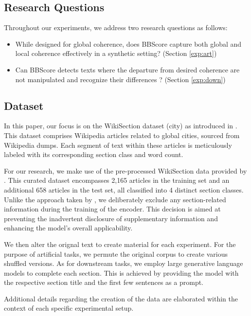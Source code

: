 \documentclass[letterpaper]{article}
\begin{document}
\subsection{Research Questions}
Throughout our experiments, we address two research questions as follows:
\begin{itemize}
\item While designed for global coherence, does BBScore capture both global and local coherence effectively in a synthetic setting? (Section \ref{exp:art})
\item Can BBScore detects texts where the departure from desired coherence are not manipulated and recognize their differences ? (Section \ref{exp:down})
\end{itemize}



\subsection{Dataset}

In this paper, our focus is on the WikiSection dataset (city) as introduced in \citep{arnold-etal-2019-sector}. This dataset comprises Wikipedia articles related to global cities, sourced from Wikipedia dumps. Each segment of text within these articles is meticulously labeled with its corresponding section class and word count.

For our research, we make use of the pre-processed WikiSection data provided by \citet{wang2023language}. This curated dataset encompasses 2,165 articles in the training set and an additional 658 articles in the test set, all classified into 4 distinct section classes. Unlike the approach taken by \citet{wang2023language}, we deliberately exclude any section-related information during the training of the encoder. This decision is aimed at preventing the inadvertent disclosure of supplementary information and enhancing the model's overall applicability.

We then alter the orignal text to create material for each experiment. For the purpose of artificial tasks, we permute the original corpus to create various shuffled versions. As for downstream tasks, we employ large generative language models to complete each section. This is achieved by providing the model with the respective section title and the first few sentences as a prompt.

Additional details regarding the creation of the data are elaborated within the context of each specific experimental setup.
\end{document}
